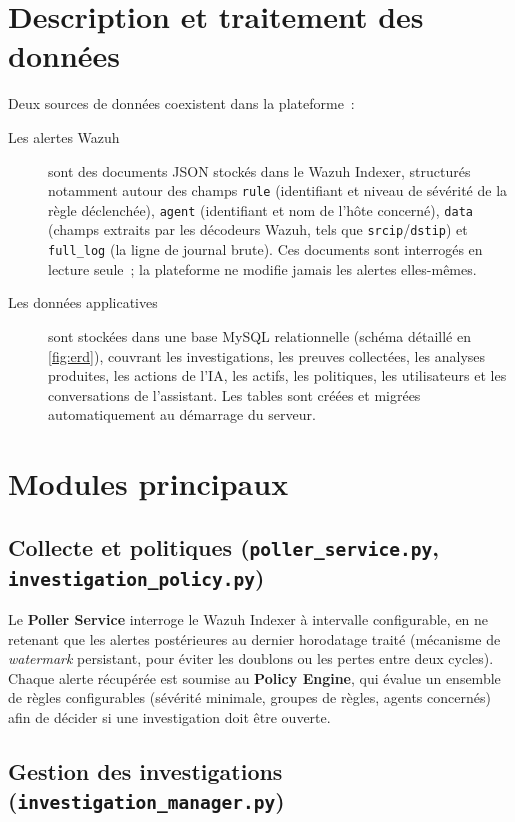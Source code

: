 \section{Description et traitement des données}

Deux sources de données coexistent dans la plateforme~:

\begin{description}
  \item[Les alertes Wazuh] sont des documents JSON stockés dans le Wazuh
    Indexer, structurés notamment autour des champs \texttt{rule} (identifiant
    et niveau de sévérité de la règle déclenchée), \texttt{agent}
    (identifiant et nom de l'hôte concerné), \texttt{data} (champs extraits
    par les décodeurs Wazuh, tels que \texttt{srcip}/\texttt{dstip}) et
    \texttt{full\_log} (la ligne de journal brute). Ces documents sont
    interrogés en lecture seule~; la plateforme ne modifie jamais les
    alertes elles-mêmes.
  \item[Les données applicatives] sont stockées dans une base MySQL
    relationnelle (schéma détaillé en \cref{fig:erd}), couvrant les
    investigations, les preuves collectées, les analyses produites, les
    actions de l'IA, les actifs, les politiques, les utilisateurs et les
    conversations de l'assistant. Les tables sont créées et migrées
    automatiquement au démarrage du serveur.
\end{description}

\section{Modules principaux}

\subsection{Collecte et politiques (\texttt{poller\_service.py},
\texttt{investigation\_policy.py})}

Le \textbf{Poller Service} interroge le Wazuh Indexer à intervalle
configurable, en ne retenant que les alertes postérieures au dernier
horodatage traité (mécanisme de \textit{watermark} persistant, pour éviter
les doublons ou les pertes entre deux cycles). Chaque alerte récupérée est
soumise au \textbf{Policy Engine}, qui évalue un ensemble de règles
configurables (sévérité minimale, groupes de règles, agents concernés) afin
de décider si une investigation doit être ouverte.

\subsection{Gestion des investigations (\texttt{investigation\_manager.py})}

